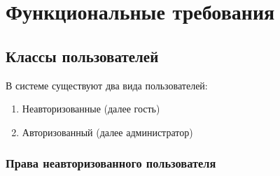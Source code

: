 \section{Функциональные требования}
\subsection{Классы пользователей}
В системе существуют два вида пользователей:
\begin{enumerate}
  \item Неавторизованные (далее гость)
  \item Авторизованный (далее администратор)
\end{enumerate}

\subsubsection{Права неавторизованного пользователя}
